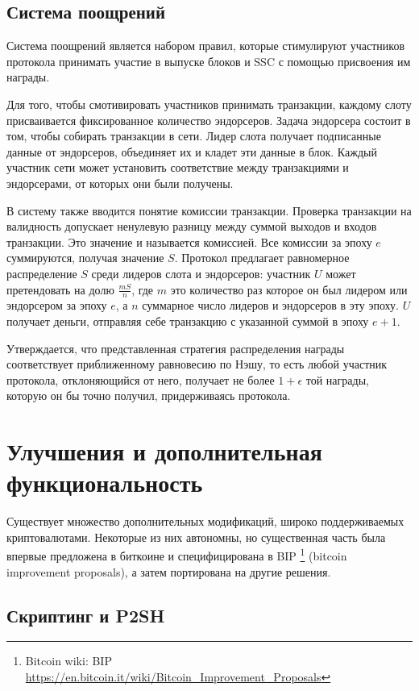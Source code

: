 \documentclass[specification,annotation]{itmo-student-thesis}
\begin{document}
\subsection{Система поощрений}

Система поощрений является набором правил, которые стимулируют
участников протокола принимать участие в выпуске блоков и SSC с
помощью присвоения им награды.

Для того, чтобы смотивировать участников принимать транзакции, каждому
слоту присваивается фиксированное количество эндорсеров. Задача
эндорсера состоит в том, чтобы собирать транзакции в сети. Лидер слота
получает подписанные данные от эндорсеров, объединяет их и кладет эти
данные в блок. Каждый участник сети может установить соответствие
между транзакциями и эндорсерами, от которых они были получены.

В систему также вводится понятие комиссии транзакции. Проверка
транзакции на валидность допускает ненулевую разницу между суммой
выходов и входов транзакции. Это значение и называется комиссией. Все
комиссии за эпоху $e$ суммируются, получая значение $S$. Протокол
предлагает равномерное распределение $S$ среди лидеров слота и
эндорсеров: участник $U$ может претендовать на долю $\frac{m S}{n}$, где
$m$ это количество раз которое он был лидером или эндорсером за эпоху
$e$, а $n$ суммарное число лидеров и эндорсеров в эту эпоху. $U$
получает деньги, отправляя себе транзакцию с указанной суммой в эпоху
$e+1$.

Утверждается, что представленная стратегия распределения награды
соответствует приближенному равновесию по Нэшу, то есть любой участник
протокола, отклоняющийся от него, получает не более $1 + \epsilon$ той
награды, которую он бы точно получил, придерживаясь протокола.

\section{Улучшения и дополнительная функциональность}

Существует множество дополнительных модификаций, широко поддерживаемых
криптовалютами. Некоторые из них автономны, но существенная часть была
впервые предложена в биткоине и специфицирована в
BIP \footnote{Bitcoin wiki: BIP
\url{https://en.bitcoin.it/wiki/Bitcoin_Improvement_Proposals}}
(bitcoin improvement proposals), а затем портирована на другие
решения.

\subsection{Скриптинг и P2SH}
\end{document}
